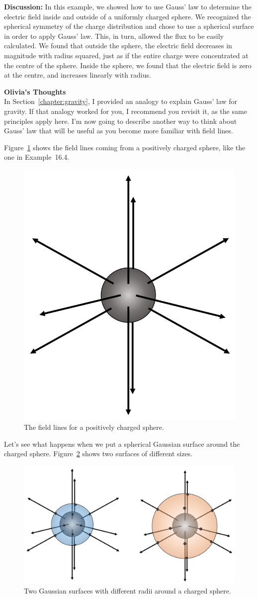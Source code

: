 \begin{framed}
\begin{framed}
\textbf{Discussion:} In this example, we showed how to use Gauss' law to determine the electric field inside and outside of a uniformly charged sphere. We recognized the spherical symmetry of the charge distribution and chose to use a spherical surface in order to apply Gauss' law.  This, in turn, allowed the flux to be easily calculated. We found that outside the sphere, the electric field decreases in magnitude with radius squared, just as if the entire charge were concentrated at the centre of the sphere. Inside the sphere, we found that the electric field is zero at the centre, and increases linearly with radius.
\end{framed}
\end{framed}

\begin{framed}
\textbf{Olivia's Thoughts}\\
In Section~\ref{chapter:gravity}, I provided an analogy to explain Gauss' law for gravity. If that analogy worked for you, I recommend you revisit it, as the same principles apply here. I'm now going to describe another way to think about Gauss' law that will be useful as you become more familiar with field lines.

Figure~\ref{fig:gauss:sphere_fieldlines} shows the field lines coming from a positively charged sphere, like the one in Example~16.4.

\begin{figure}[!htbp]
\centering
\includegraphics[width=0.3\linewidth]{files/sphere_fieldlines-65b7b440bddcf87b2453dc79de3bf357.png}
\caption[]{The field lines for a positively charged sphere.}
\label{fig:gauss:sphere_fieldlines}
\end{figure}

Let's see what happens when we put a spherical Gaussian surface around the charged sphere. Figure~\ref{fig:gauss:2surfaces_1} shows two surfaces of different sizes.

\begin{figure}[!htbp]
\centering
\includegraphics[width=0.6\linewidth]{files/2surfaces_1-d3a5fe6e84b1b1eae3399078f9dfcc82.png}
\caption[]{Two Gaussian surfaces with different radii around a charged sphere.}
\label{fig:gauss:2surfaces_1}
\end{figure}


\end{framed}
